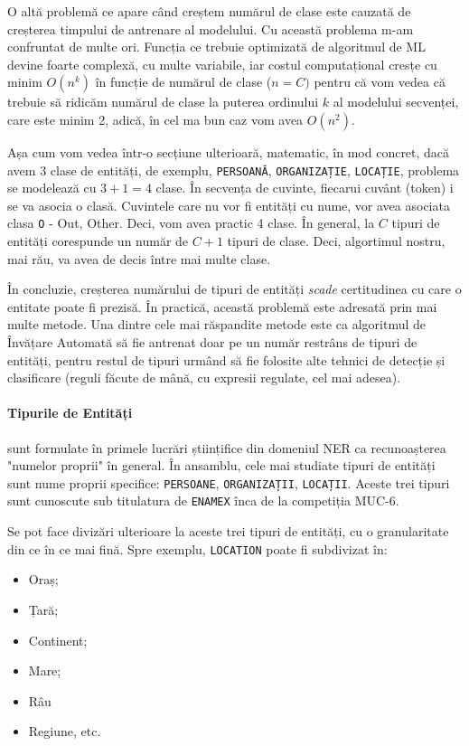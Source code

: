O altă problemă ce apare când creștem numărul de clase este cauzată de creșterea timpului de antrenare al modelului. Cu această problema m-am confruntat de multe ori. Funcția ce trebuie optimizată de algoritmul de ML devine foarte complexă, cu multe variabile, iar costul computațional cresțe cu minim $ O(n^k) $ în funcție de numărul de clase ($n = C)$ pentru că vom vedea că trebuie să ridicăm numărul de clase la puterea ordinului $k$ al modelului secvenței, care este minim 2, adică, în cel ma bun caz vom avea $ O(n^2) $.

Așa cum vom vedea într-o secțiune ulterioară, matematic, în mod concret, dacă avem 3 clase de entități, de exemplu, \texttt{PERSOANĂ}, \texttt{ORGANIZAȚIE}, \texttt{LOCAȚIE}, problema se modelează cu $3 + 1  = 4$ clase. În secvența de cuvinte, fiecarui cuvânt (token) i se va asocia o clasă. Cuvintele care nu vor fi entități cu nume, vor avea asociata clasa \texttt{O} - Out, Other. Deci, vom avea practic 4 clase. În general, la $C$ tipuri de entități corespunde un număr de $C + 1$ tipuri de clase. Deci, algortimul nostru, mai rău, va avea de decis între mai multe clase. 

În concluzie, creșterea numărului de tipuri de entități \textit{scade} certitudinea cu care o entitate poate fi prezisă. În practică, această problemă este adresată prin mai multe metode. Una dintre cele mai răspandite metode este ca algoritmul de Învățare Automată să fie antrenat doar pe un număr restrâns de tipuri de entități, pentru restul de tipuri urmând să fie folosite alte tehnici de detecție și clasificare (reguli făcute de mână, cu expresii regulate, cel mai adesea).

\paragraph{Tipurile de Entități} sunt formulate în primele lucrări științifice din domeniul NER ca recunoașterea "numelor proprii" în general. În ansamblu, cele mai  studiate tipuri de entități sunt nume proprii specifice: \texttt{PERSOANE}, \texttt{ORGANIZAȚII}, \texttt{LOCAȚII}. Aceste trei tipuri sunt cunoscute sub titulatura de \texttt{ENAMEX} înca de la competiția MUC-6\cite{grishman1996}.

Se pot face divizări ulterioare la aceste trei tipuri de entități, cu o granularitate din ce în ce mai fină. Spre exemplu, \texttt{LOCATION} poate fi subdivizat în:

\begin{itemize}
\item Oraș;
\item Țară;
\item Continent;
\item Mare;
\item Râu
\item Regiune, etc.
\end{itemize}

